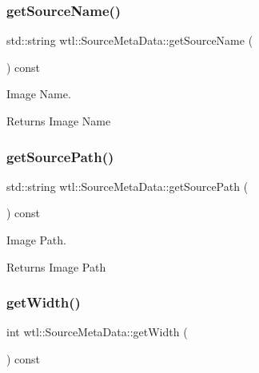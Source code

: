 \subsubsection{\texorpdfstring{get\+Source\+Name()}{getSourceName()}}
{\footnotesize\ttfamily std\+::string wtl\+::\+Source\+Meta\+Data\+::get\+Source\+Name (\begin{DoxyParamCaption}{ }\end{DoxyParamCaption}) const}



Image Name. 

\begin{DoxyReturn}{Returns}
Image Name 
\end{DoxyReturn}
\mbox{\label{classwtl_1_1_source_meta_data_a97c4d177a47b1dc7e761e4eb652ff663}} 
\subsubsection{\texorpdfstring{get\+Source\+Path()}{getSourcePath()}}
{\footnotesize\ttfamily std\+::string wtl\+::\+Source\+Meta\+Data\+::get\+Source\+Path (\begin{DoxyParamCaption}{ }\end{DoxyParamCaption}) const}



Image Path. 

\begin{DoxyReturn}{Returns}
Image Path 
\end{DoxyReturn}
\mbox{\label{classwtl_1_1_source_meta_data_a42f1f73264921d73e5ba08a589630ea0}} 
\subsubsection{\texorpdfstring{get\+Width()}{getWidth()}}
{\footnotesize\ttfamily int wtl\+::\+Source\+Meta\+Data\+::get\+Width (\begin{DoxyParamCaption}{ }\end{DoxyParamCaption}) const}



